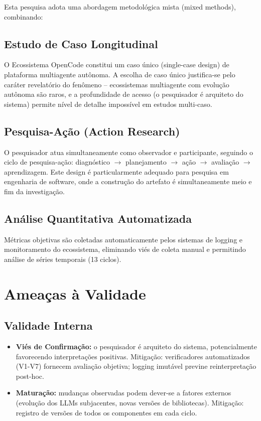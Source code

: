 \documentclass[12pt,a4paper,sumario=tradicional]{abntex2}
\begin{document}
Esta pesquisa adota uma abordagem metodológica mista (mixed methods), combinando:

\subsection{Estudo de Caso Longitudinal}

O Ecossistema OpenCode constitui um caso único (single-case design) de plataforma multiagente autônoma. A escolha de caso único justifica-se pelo caráter revelatório do fenômeno -- ecossistemas multiagente com evolução autônoma são raros, e a profundidade de acesso (o pesquisador é arquiteto do sistema) permite nível de detalhe impossível em estudos multi-caso.

\subsection{Pesquisa-Ação (Action Research)}

O pesquisador atua simultaneamente como observador e participante, seguindo o ciclo de pesquisa-ação: diagnóstico $\rightarrow$ planejamento $\rightarrow$ ação $\rightarrow$ avaliação $\rightarrow$ aprendizagem. Este design é particularmente adequado para pesquisa em engenharia de software, onde a construção do artefato é simultaneamente meio e fim da investigação.

\subsection{Análise Quantitativa Automatizada}

Métricas objetivas são coletadas automaticamente pelos sistemas de logging e monitoramento do ecossistema, eliminando viés de coleta manual e permitindo análise de séries temporais (13 ciclos).

\section{Ameaças à Validade}

\subsection{Validade Interna}

\begin{itemize}
    \item \textbf{Viés de Confirmação:} o pesquisador é arquiteto do sistema, potencialmente favorecendo interpretações positivas. Mitigação: verificadores automatizados (V1-V7) fornecem avaliação objetiva; logging imutável previne reinterpretação post-hoc.
    \item \textbf{Maturação:} mudanças observadas podem dever-se a fatores externos (evolução dos LLMs subjacentes, novas versões de bibliotecas). Mitigação: registro de versões de todos os componentes em cada ciclo.
\end{itemize}
\end{document}
